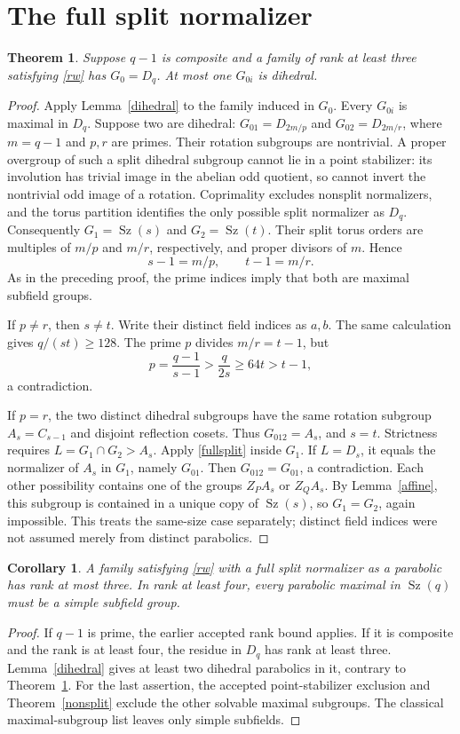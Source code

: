 \documentclass[11pt,a4paper]{article}
\newtheorem{theorem}[lemma]{Theorem}
\newtheorem{corollary}[lemma]{Corollary}
\newcommand{\Sz}{\operatorname{Sz}}
\begin{document}
\section{The full split normalizer}
\begin{theorem}\label{split}
Suppose $q-1$ is composite and a family of rank at least three satisfying
\eqref{rw} has $G_0=D_q$. At most one $G_{0i}$ is dihedral.
\end{theorem}
\begin{proof}
Apply Lemma~\ref{dihedral} to the family induced in $G_0$.
Every $G_{0i}$ is maximal in $D_q$. Suppose two are dihedral:
$G_{01}=D_{2m/p}$ and $G_{02}=D_{2m/r}$, where $m=q-1$ and
$p,r$ are primes. Their rotation subgroups are nontrivial.
A proper overgroup of such a split dihedral subgroup cannot lie in a
point stabilizer: its involution has trivial image in the abelian odd
quotient, so cannot invert the nontrivial odd image of a rotation.
Coprimality excludes nonsplit normalizers, and the torus partition
identifies the only possible split normalizer as $D_q$.
Consequently $G_1=\Sz(s)$ and $G_2=\Sz(t)$.
Their split torus orders are multiples of $m/p$ and $m/r$, respectively,
and proper divisors of $m$. Hence
\[
 s-1=m/p,\qquad t-1=m/r.
\]
As in the preceding proof, the prime indices imply that both are
maximal subfield groups.

If $p\ne r$, then $s\ne t$. Write their distinct field indices as
$a,b$. The same calculation gives $q/(st)\ge128$.
The prime $p$ divides $m/r=t-1$, but
\[
 p=\frac{q-1}{s-1}>\frac{q}{2s}\ge64t>t-1,
\]
a contradiction.

If $p=r$, the two distinct dihedral subgroups have the same rotation
subgroup $A_s=C_{s-1}$ and disjoint reflection cosets. Thus
$G_{012}=A_s$, and $s=t$. Strictness requires
$L=G_1\cap G_2>A_s$. Apply \eqref{fullsplit} inside $G_1$.
If $L=D_s$, it equals the normalizer of $A_s$ in $G_1$, namely
$G_{01}$. Then $G_{012}=G_{01}$, a contradiction. Each other
possibility contains one of the groups $Z_P A_s$ or $Z_Q A_s$.
By Lemma~\ref{affine}, this subgroup is contained in a unique copy
of $\Sz(s)$, so $G_1=G_2$, again impossible. This treats the
same-size case separately; distinct field indices were not assumed
merely from distinct parabolics.
\end{proof}

\begin{corollary}\label{rank}
A family satisfying \eqref{rw} with a full split normalizer as a
parabolic has rank at most three. In rank at least four, every
parabolic maximal in $\Sz(q)$ must be a simple subfield group.
\end{corollary}
\begin{proof}
If $q-1$ is prime, the earlier accepted rank bound applies.
If it is composite and the rank is at least four, the residue in
$D_q$ has rank at least three. Lemma~\ref{dihedral} gives at least
two dihedral parabolics in it, contrary to Theorem~\ref{split}.
For the last assertion, the accepted point-stabilizer exclusion and
Theorem~\ref{nonsplit} exclude the other solvable maximal subgroups.
The classical maximal-subgroup list leaves only simple subfields.
\end{proof}
\end{document}
